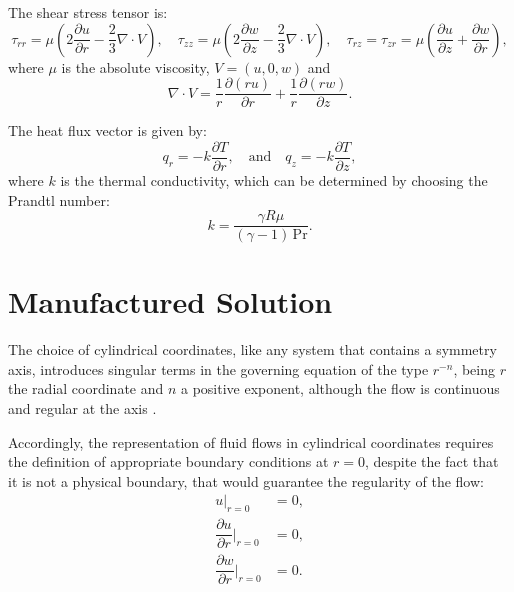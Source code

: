 \documentclass[a4paper,10pt]{article}
\newcommand{\Diff}[2] {\dfrac{\partial( #1)}{\partial #2}}
\newcommand{\diff}[2] {\dfrac{\partial #1}{\partial #2}}
\begin{document}
\begin{landscape}
The shear stress tensor is:
\begin{equation}
\tau_{rr}=  \mu \left( 2 \diff{u}{r} - \dfrac{2}{3} \nabla \cdot V \right),
\quad  \tau_{zz}=  \mu \left( 2 \diff{w}{z} - \dfrac{2}{3} \nabla \cdot V \right),
\quad\tau_{rz}= \tau_{zr}=\mu \left( \diff{u}{z} + \diff{w}{r}\right),
\end{equation}
where $\mu$ is the absolute viscosity, $V=(u,0,w)$ and $$\nabla \cdot V = \dfrac{1}{r}\Diff{ru}{r}+\dfrac{1}{r}\Diff{rw}{z}.$$

The heat flux vector is given by:
\begin{equation}
 q_r = - k \diff{T}{r},  \quad \mbox{and} \quad q_z = - k \diff{T}{z},
 \end{equation}
where $k$ is the thermal conductivity, which can be determined by choosing the Prandtl number:
$$k= \dfrac{\gamma R \mu}{ (\gamma-1) \, \mbox{Pr} }.$$


\section{Manufactured Solution}

The choice of cylindrical coordinates, like any system that contains a symmetry axis, introduces singular terms in the governing equation of the type $r^{-n}$, being $r$ the radial coordinate and $n$ a positive exponent, %
 although the flow is continuous and regular at the axis \cite{Domenichini2004}.


Accordingly, the representation of fluid flows in cylindrical coordinates requires the definition of appropriate boundary conditions at $r=0$, despite the fact that it is not a physical boundary, that would guarantee the regularity of the flow: %
\begin{equation}
\label{cc}
\begin{split}
u \big| _{r=0} &=0,\\
 \diff{u}{r}\Big| _{r=0} &=0,\\
\diff{w}{r}\Big| _{r=0} &=0.\\
\end{split}
\end{equation}


\end{landscape}
\end{document}
